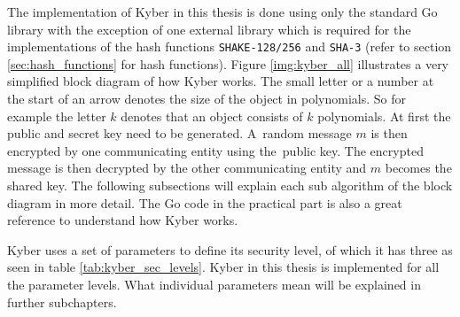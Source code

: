 The implementation of Kyber in this thesis is done using only the standard Go library with the exception of one external library \cite{00fV2cvg7Z6H2tS3} which is required for the implementations of the hash functions \texttt{SHAKE-128/256} and \texttt{SHA-3} (refer to section \ref{sec:hash_functions} for hash functions). Figure \ref{img:kyber_all} illustrates a very simplified block diagram of how Kyber works. The small letter or a number at the start of an arrow denotes the size of the object in polynomials. So for example the letter $k$ denotes that an object consists of $k$ polynomials. At first the public and secret key need to be generated. A~random message $m$ is then encrypted by one communicating entity using the~public key. The encrypted message is then decrypted by the other communicating entity and $m$ becomes the shared key. The following subsections will explain each sub algorithm of the block diagram in more detail. The Go code in the practical part is also a great reference to understand how Kyber works.


Kyber uses a set of parameters to define its security level, of which it has three as seen in table \ref{tab:kyber_sec_levels}. Kyber in this thesis is implemented for all the parameter levels. What individual parameters mean will be explained in further subchapters.
